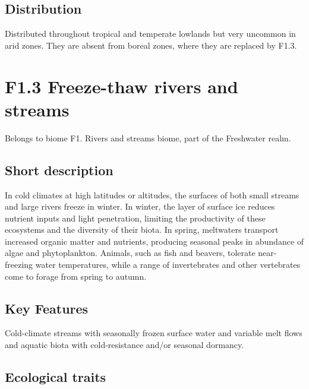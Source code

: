 \documentclass[
  letterpaper,
  DIV=11,
  numbers=noendperiod]{scrartcl}
\begin{document}
\subsection{Distribution}\label{distribution-110}

Distributed throughout tropical and temperate lowlands but very uncommon
in arid zones. They are absent from boreal zones, where they are
replaced by F1.3.

\section{F1.3 Freeze-thaw rivers and
streams}\label{f1.3-freeze-thaw-rivers-and-streams-1}

Belongs to biome F1. Rivers and streams biome, part of the Freshwater
realm.

\subsection{Short description}\label{short-description-111}

In cold climates at high latitudes or altitudes, the surfaces of both
small streams and large rivers freeze in winter. In winter, the layer of
surface ice reduces nutrient inputs and light penetration, limiting the
productivity of these ecosystems and the diversity of their biota. In
spring, meltwaters transport increased organic matter and nutrients,
producing seasonal peaks in abundance of algae and phytoplankton.
Animals, such as fish and beavers, tolerate near-freezing water
temperatures, while a range of invertebrates and other vertebrates come
to forage from spring to autumn.

\subsection{Key Features}\label{key-features-111}

Cold-climate streams with seasonally frozen surface water and variable
melt flows and aquatic biota with cold-resistance and/or seasonal
dormancy.

\subsection{Ecological traits}\label{ecological-traits-111}
\end{document}
